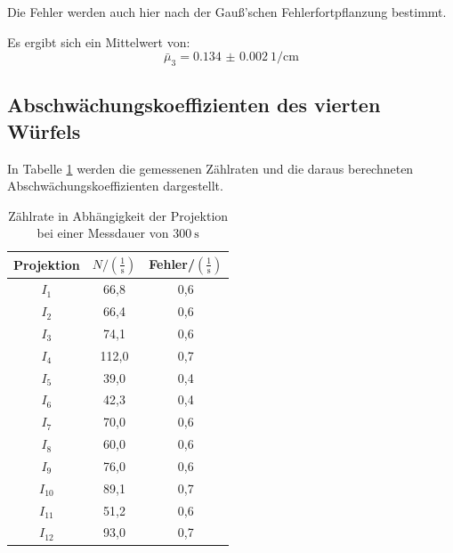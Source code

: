 Die Fehler werden auch hier nach der Gauß'schen Fehlerfortpflanzung bestimmt.

Es ergibt sich ein Mittelwert von:
\begin{equation*}
  \bar\mu_3 = \SI{0.134(2)}{1\per\centi\meter}
\end{equation*}


\subsection{Abschwächungskoeffizienten des vierten Würfels}
In Tabelle \ref{tab:mu} werden die gemessenen Zählraten und
die daraus berechneten Abschwächungskoeffizienten dargestellt.

\begin{table}[H]
  \centering
  \caption{Zählrate in Abhängigkeit der Projektion bei einer Messdauer von $\SI{300}{\second}$}
  \label{tab:mu}
  \begin{tabular}{c c c}
    \toprule
    Projektion & $N/ \left(\mathrm{\frac{1}{s}}\right)$ & Fehler/$\left(\mathrm{\frac{1}{s}}\right)$   \\
    \midrule
        $I_1$    & 66,8  & 0,6    \\
        $I_2$    & 66,4  & 0,6    \\
        $I_3$    & 74,1  & 0,6    \\
        $I_4$    & 112,0 & 0,7    \\
        $I_5$    & 39,0  & 0,4    \\
        $I_6$    & 42,3  & 0,4    \\
        $I_7$    & 70,0  & 0,6    \\
        $I_8$    & 60,0  & 0,6    \\
        $I_9$    & 76,0  & 0,6    \\
        $I_{10}$ & 89,1  & 0,7   \\
        $I_{11}$ & 51,2  & 0,6    \\
        $I_{12}$ & 93,0  & 0,7    \\
    \bottomrule
  \end{tabular}
\end{table}

